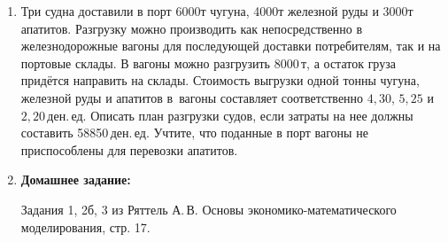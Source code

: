 \documentclass[a5paper,10pt]{extarticle}
\begin{document}
\begin{enumerate}
Найти количество сырья, которое следует переработать по каждой технологии, чтобы произвести 574~изделия~$A$ и~328~изделий~$B$ из 94\;ед. сырья.

\item 
	Три судна доставили в порт 6000\;т чугуна, 4000\;т железной руды и 3000\;т апатитов. Разгрузку можно производить как непосредственно в железнодорожные вагоны для последующей доставки потребителям, так и на портовые склады. В вагоны можно разгрузить 8000\,т, а остаток груза придётся направить на склады.  Стоимость выгрузки одной тонны чугуна, железной руды и апатитов в~вагоны составляет соответственно $4{,}30$, $5{,}25$ и $2{,}20$\,ден.\,ед.
Описать план разгрузки судов, если затраты на нее должны составить 58850\,ден.\,ед. Учтите, что поданные в порт вагоны не приспособлены для перевозки апатитов.

\item \textbf{Домашнее задание:}\par
	Задания 1, 2б, 3 из Ряттель А.\,В. Основы экономико-математического моделирования, стр. 17.
\end{enumerate}
\newpage
\end{document}
